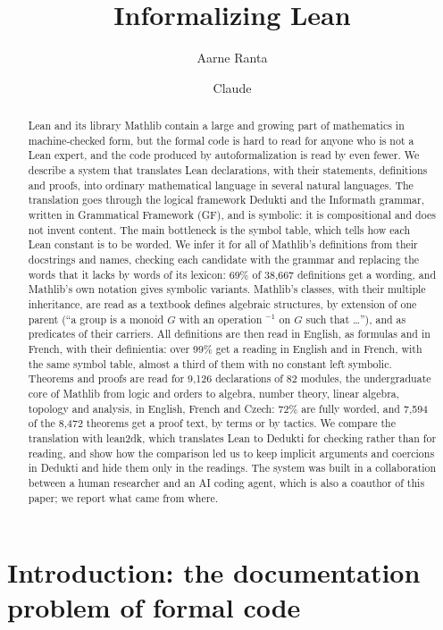 \documentclass{easychair}
\title{Informalizing Lean}
\author{
  Aarne Ranta\inst{1}
  \and
  Claude\inst{2}
}
\institute{
  Department of Computer Science and Engineering,
  Chalmers University of Technology and University of Gothenburg, Sweden\\
  \email{aarne.ranta@cse.gu.se}
  \and
  Claude Code, an AI coding agent by Anthropic, working in the first author's checkout
}
\begin{document}
\maketitle

\begin{abstract}
Lean and its library Mathlib contain a large and growing part of mathematics in machine-checked
form, but the formal code is hard to read for anyone who is not a Lean expert, and the code
produced by autoformalization is read by even fewer. We describe a system that translates Lean
declarations, with their statements, definitions and proofs, into ordinary mathematical
language in several natural languages. The translation goes through the logical framework
Dedukti and the Informath grammar, written in Grammatical Framework (GF), and is symbolic: it is
compositional and does not invent content. The main bottleneck is the symbol table, which tells
how each Lean constant is to be worded. We infer it for all of Mathlib's definitions from
their docstrings and names, checking each candidate with the grammar and replacing the words
that it lacks by words of its lexicon: 69\% of 38,667 definitions get a wording, and Mathlib's
own notation gives symbolic variants. Mathlib's classes, with their multiple inheritance, are
read as a textbook defines algebraic structures, by extension of one parent (``a group is a
monoid $G$ with an operation ${}^{-1}$ on $G$ such that \ldots''), and as predicates of their
carriers. All definitions are then read in English, as formulas and in French, with their
definientia: over 99\% get a reading in English and in French, with the same symbol table,
almost a third of them with no constant left symbolic. Theorems and proofs are read for
9,126 declarations of 82 modules, the undergraduate core of Mathlib from logic and orders to
algebra, number theory, linear algebra, topology and analysis, in English, French and Czech:
72\% are fully worded, and 7,594 of the 8,472 theorems get a proof text, by terms or by
tactics. We compare the translation with lean2dk, which translates Lean to Dedukti for checking
rather than for reading, and show how the comparison led us to keep implicit arguments and
coercions in Dedukti and hide them only in the readings.
The system was built in a collaboration between a human researcher and an AI coding agent, which
is also a coauthor of this paper; we report what came from where.
\end{abstract}

\section{Introduction: the documentation problem of formal code}
\end{document}
